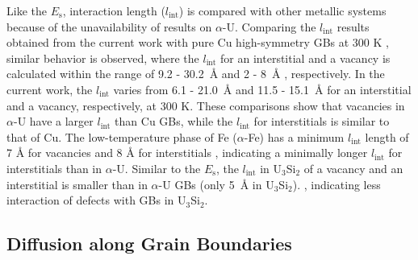 \documentclass[review]{elsarticle}
\begin{document}
Like the $E_{\mathrm{s}}$, interaction length ($l_{\mathrm{int}}$) is compared with other metallic systems because of the unavailability of results on $\alpha$-U. Comparing the $l_{\mathrm{int}}$ results obtained from the current work with pure Cu high-symmetry GBs at 300 K \cite{bai_cu_inter, bai_cu_gb_with_interstitial_inter}, similar behavior is observed, where the  $l_{\mathrm{int}}$ for an interstitial and a vacancy is calculated within the range of 9.2 - 30.2~{\AA} and 2 - 8~{\AA} \cite{bai_cu_inter}, respectively. In the current work, the  $l_{\mathrm{int}}$ varies from 6.1 - 21.0~{\AA} and 11.5 - 15.1~{\AA} for an interstitial and a vacancy, respectively, at 300 K. These comparisons show that vacancies in $\alpha$-U have a larger  $l_{\mathrm{int}}$ than Cu GBs, while the  $l_{\mathrm{int}}$ for interstitials is similar to that of Cu. The low-temperature phase of Fe ($\alpha$-Fe) has a minimum  $l_{\mathrm{int}}$ length of 7 {\AA} for vacancies and 8 {\AA} for interstitials \cite{tschopp2012probing}, indicating a minimally longer $l_{\mathrm{int}}$ for interstitials than in $\alpha$-U. Similar to the $E_{\mathrm{s}}$, the $l_{\mathrm{int}}$ in U$_\mathrm{3}$Si$_\mathrm{2}$ of a vacancy and an interstitial is smaller than in $\alpha$-U GBs (only 5~{\AA} in U$_3$Si$_2$). \cite{beeler2019}, indicating less interaction of defects with GBs in U$_3$Si$_2$. 


\subsection{Diffusion along Grain Boundaries}
\end{document}
